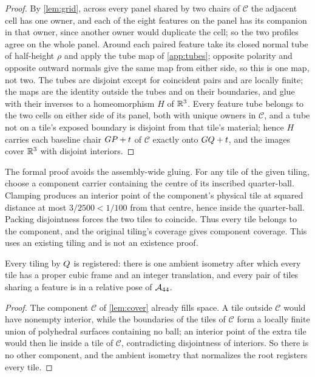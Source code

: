 \begin{proof}
By \cref{lem:grid}, across every panel shared by two chairs of $\mathcal{C}$ the adjacent cell has one owner, and each
of the eight features on the panel has its companion in that owner, since another owner would
duplicate the cell; so the two profiles agree on the whole panel. Around each paired feature take
its closed normal tube of half-height $\rho$ and apply the tube map of \cref{app:tubes}; opposite
polarity and opposite outward normals give the same map from either side, so this is one map, not
two. The tubes are disjoint except for coincident pairs and are locally finite; the maps are the
identity outside the tubes and on their boundaries, and glue with their inverses to a
homeomorphism $H$ of $\mathbb{R}^3$. Every feature tube belongs to the two cells on either side of its
panel, both with unique owners in $\mathcal{C}$, and a tube not on a tile's exposed boundary is
disjoint from that tile's material; hence $H$ carries each baseline chair $GP+t$ of
$\mathcal{C}$ exactly onto $GQ+t$, and the images cover $\mathbb{R}^3$ with disjoint interiors.
\end{proof}

The formal proof avoids the assembly-wide gluing. For any tile of the given tiling, choose a
component carrier containing the centre of its inscribed quarter-ball. Clamping produces an
interior point of the component's physical tile at squared distance at most $3/2500<1/100$ from
that centre, hence inside the quarter-ball. Packing disjointness forces the two tiles to
coincide. Thus every tile belongs to the component, and the original tiling's coverage gives
component coverage. This uses an existing tiling and is not an existence proof.

\begin{theorem}\label{thm:registration}
Every tiling by $Q$ is registered: there is one ambient isometry after which every tile has
a proper cubic frame and an integer translation, and every pair of tiles sharing a feature is in a
relative pose of $\mathcal{A}_{44}$.
\end{theorem}

\begin{proof}
The component $\mathcal{C}$ of \cref{lem:cover} already fills space. A tile outside $\mathcal{C}$
would have nonempty interior, while the boundaries of the tiles of $\mathcal{C}$ form a locally
finite union of polyhedral surfaces containing no ball; an interior point of the extra tile would
then lie inside a tile of $\mathcal{C}$, contradicting disjointness of interiors. So there is no
other component, and the ambient isometry that normalizes the root registers every tile.
\end{proof}

